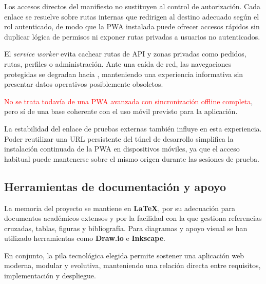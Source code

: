 Los accesos directos del manifiesto no sustituyen al control de autorización. Cada enlace se resuelve sobre rutas internas que redirigen al destino adecuado según el rol autenticado, de modo que la PWA instalada puede ofrecer accesos rápidos sin duplicar lógica de permisos ni exponer rutas privadas a usuarios no autenticados.

El \textit{service worker} evita cachear rutas de API y zonas privadas como pedidos, rutas, perfiles o administración. Ante una caída de red, las navegaciones protegidas se degradan hacia , manteniendo una experiencia informativa sin presentar datos operativos posiblemente obsoletos.

\textcolor{red}{No se trata todavía de una PWA avanzada con sincronización offline completa}, pero sí de una base coherente con el uso móvil previsto para la aplicación.

La estabilidad del enlace de pruebas externas también influye en esta experiencia. Poder reutilizar una URL persistente del túnel de desarrollo simplifica la instalación continuada de la PWA en dispositivos móviles, ya que el acceso habitual puede mantenerse sobre el mismo origen durante las sesiones de prueba.

\subsection{Herramientas de documentación y apoyo}

La memoria del proyecto se mantiene en \textbf{LaTeX}, por su adecuación para documentos académicos extensos y por la facilidad con la que gestiona referencias cruzadas, tablas, figuras y bibliografía. Para diagramas y apoyo visual se han utilizado herramientas como \textbf{Draw.io} e \textbf{Inkscape}.

En conjunto, la pila tecnológica elegida permite sostener una aplicación web moderna, modular y evolutiva, manteniendo una relación directa entre requisitos, implementación y despliegue.
